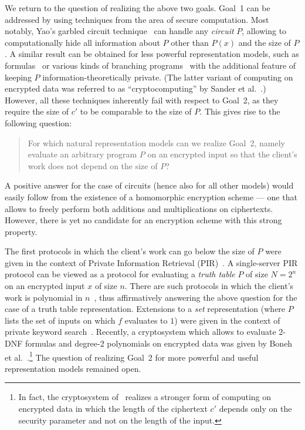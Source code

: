 \documentclass{article}
\begin{document}
We return to the question of realizing the above two goals. Goal~1
can be addressed by using techniques from the area of secure
computation.  Most notably, Yao's garbled circuit
technique~\cite{yao86,cckm00,LP04} can handle any {\em circuit} $P$,
allowing to computationally hide all information about $P$ other
than $P(x)$ and the size of $P$. A similar result can be obtained
for less powerful representation models, such as
formulas~\cite{syy99,K,Kol} or various kinds of branching
programs~\cite{beaver00,FKN94,ik00,Rap} with the additional feature of
keeping $P$ information-theoretically private. (The latter variant
of computing on encrypted data was referred to as
``cryptocomputing'' by Sander et al.~\cite{syy99}.) However, all
these techniques inherently fail with respect to Goal~2, as they
require the size of $c'$ to be comparable to the size of $P$. This
gives rise to the following question:
\begin{quote}
For which natural representation models can we realize Goal~2,
namely evaluate an arbitrary program $P$ on an encrypted input
so that the client's work does not depend on the size of $P$?
\end{quote}
A positive answer for the case of circuits (hence also for all
other models) would easily follow from the existence of a 
homomorphic encryption scheme --- one that allows to freely perform
both additions and multiplications on ciphertexts. However, there
is yet no candidate for an encryption scheme with this strong
property.

The first protocols in which the client's work can go below the
size of $P$ were given in the context of Private Information
Retrieval (PIR)~\cite{CGKS95,KO97}. A single-server PIR
protocol can be viewed as a protocol for evaluating a {\em
truth table} $P$ of size $N=2^n$ on an encrypted input $x$ of
size $n$. There are such protocols in which the client's work
is polynomial in $n$~\cite{cms99,L04}, thus affirmatively
answering the above question for the case of a truth table
representation.
Extensions to a {\em set} representation (where $P$ lists the set
of inputs on which $f$ evaluates to $1$) were given in the context
of private keyword search~\cite{KO97,CGN,FIPR05,OS}. Recently, a cryptosystem which allows to evaluate 2-DNF formulas and degree-2
polynomials on encrypted data was given by Boneh et
al.~\cite{BGN}.\footnote{In fact, the cryptosystem of~\cite{BGN} realizes a stronger form of computing on encrypted data in which the length
of the ciphertext $c'$ depends only on the security parameter and
not on the length of the input. } The question of realizing Goal~2
for more powerful and useful representation models remained open.
\end{document}
